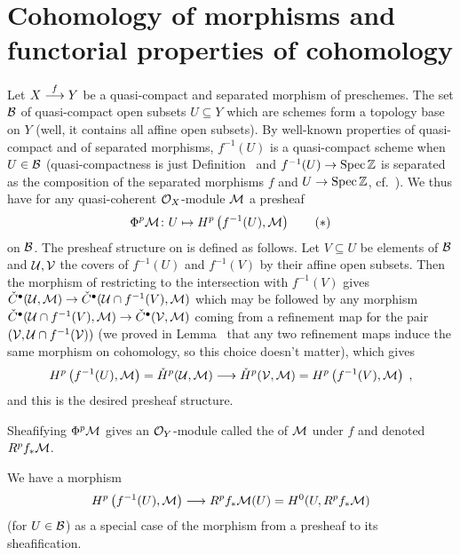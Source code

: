 \documentclass[a4paper,parskip=half,numbers=enddot, DIV=12]{scrreprt}
\begin{document}
\section{Cohomology of morphisms and functorial properties of cohomology}
Let $X\morphism[f]Y$ be a quasi-compact and separated morphism of preschemes. The set $\mathcal{B}$ of quasi-compact open subsets $U\subseteq Y$ which are schemes form a topology base on $Y$ (well, it contains all affine open subsets). By well-known properties of quasi-compact and of separated morphisms, $f^{-1}(U)$ is a quasi-compact scheme when $U\in \mathcal{B}$ (quasi-compactness is just Definition~ and $f^{-1}(U)\morphism\Spec\IZ$ is separated as the composition of the separated morphisms $f$ and $U\morphism\Spec \IZ$, cf.\ \cite[Fact~1.5.7]{alggeo1}). We thus have for any quasi-coherent $\mathcal{O}_X$-module $\mathcal{M}$ a presheaf
\begin{align}\lbl{eq:cohoPresheaf}
	\Phi^p\Mm\colon U\mapsto H^p\left(f^{-1}(U),\Mm\right)\tag{$*$}
\end{align}
on $\mathcal{B}$. The presheaf structure on  is defined as follows. Let $V\subseteq U$ be elements of $\mathcal{B}$ and $\mathcal{U},\mathcal{V}$ the covers of $f^{-1}(U)$ and $f^{-1}(V)$ by their affine open subsets. Then the morphism of restricting to the intersection with $f^{-1}(V)$ gives $\check{C}^\bullet (\Uu,\Mm)\morphism\check{C}^\bullet (\Uu\cap f^{-1}(V),\Mm)$ which may be followed by any morphism $\check{C}^\bullet (\Uu\cap f^{-1}(V),\Mm)\morphism\check{C}^\bullet (\Vv,\Mm)$ coming from a refinement map for the pair $(\mathcal{V},\mathcal{U}\cap f^{-1}(\mathcal{V}))$ 
(we proved in Lemma~ that any two refinement maps induce the same morphism on cohomology, so this choice doesn't matter), which gives
\begin{align*}
	H^p\left(f^{-1}(U),\Mm\right)=\check{H}^p(\Uu,\Mm)\morphism\check{H}^p(\Vv,\Mm)=H^p\left(f^{-1}(V),\Mm\right)\;,
\end{align*}
and this is the desired presheaf structure.

\begin{defi}
	Sheafifying $\Phi^p\mathcal{M}$ gives an $\mathcal{O}_Y$-module called the  of $\mathcal{M}$ under $f$ and denoted $R^pf_*\mathcal{M}$.
\end{defi}
 We have a morphism
 \begin{align}\lbl{eq:HpToRp}
 	H^p\left(f^{-1}(U),\Mm\right)\morphism R^pf_*\Mm(U)=H^0(U,R^pf_*\Mm)
 \end{align}
 (for $U\in\mathcal{B}$) as a special case of the morphism from a presheaf to its sheafification.
 
\end{document}
